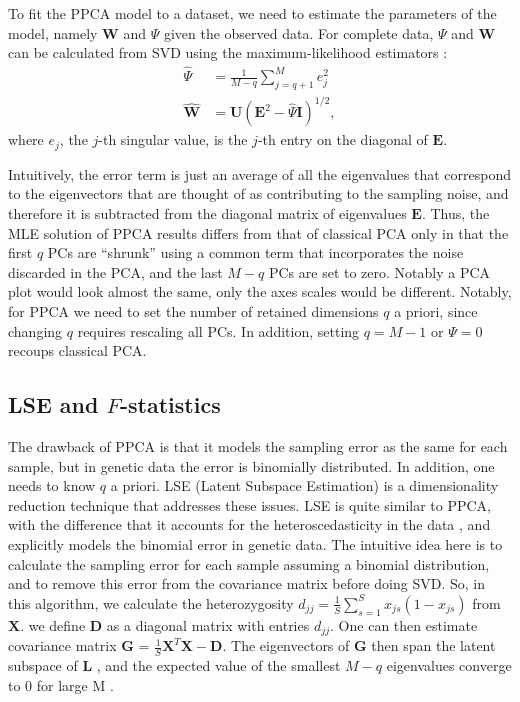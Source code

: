 \documentclass[12pt]{article}
\newcommand{\BI}{\mathbf{I}}
\newcommand{\MX}{\mathbf{X}}
\newcommand{\MG}{\mathbf{G}}
\begin{document}
To fit the PPCA model to a dataset, we need to estimate the parameters of the model, namely $\mathbf{W}$ and $\Psi$ given the observed data. For complete data, $\Psi$ and $\mathbf{W}$ can be calculated from SVD using the maximum-likelihood estimators \cite{tipping_probabilistic_1999}:
\begin{align*}
    \hat{\Psi} &= \frac{1}{M-q}\sum_{j=q+1}^M e_{j}^2\\
    \hat{\mathbf{W}} &= \mathbf{U}(\mathbf{E}^2 - \hat{\Psi}\BI)^{1/2},
\end{align*}
where $e_j$, the $j$-th singular value, is the $j$-th entry on the diagonal of $\mathbf{E}$.

Intuitively, the error term is just an average of all the eigenvalues that correspond to the eigenvectors that are thought of as contributing to the sampling noise, and therefore it is subtracted from the diagonal matrix of eigenvalues $\mathbf{E}$. Thus, the MLE solution of PPCA results differs from that of classical PCA only in that the first $q$ PCs are ``shrunk'' using a common term that incorporates the noise discarded in the PCA, and the last $M-q$ PCs are set to zero. Notably a PCA plot would look almost the same, only the axes scales would be different. Notably, for PPCA we need to set the number of retained dimensions $q$ a priori, since changing $q$ requires rescaling all PCs. In addition, setting $q=M-1$ or $\Psi=0$ recoups classical PCA.

\subsection{LSE and $F$-statistics}\label{theory-lse}
The drawback of PPCA is that it models the sampling error as the same for each sample, but in genetic data the error is binomially distributed. In addition, one needs to know $q$ a priori. LSE (Latent Subspace Estimation) is a dimensionality reduction technique that addresses these issues. LSE is quite similar to PPCA, with the difference that it accounts for the heteroscedasticity in the data \citep{chen_consistent_2015}, and explicitly models the binomial error in genetic data. The intuitive idea here is to calculate the sampling error for each sample assuming a binomial distribution, and to remove this error from the covariance matrix before doing SVD. So, in this algorithm, we calculate the heterozygosity  $d_{jj} = \frac{1}{S}\sum_{s=1}^S x_{js}(1 - x_{js})$ from $\MX$. we define $\mathbf{D}$ as a diagonal matrix with entries  $d_{jj}$. One can then estimate covariance matrix $\MG$ = $\frac{1}{S}\MX^T\MX - \mathbf{D}$. The eigenvectors of $\mathbf{G}$ then span the latent subspace of $\mathbf{L}$ , and the expected value of the smallest $M-q$ eigenvalues converge to 0 for large M \citep{cabreros_likelihood-free_2019}.
\end{document}
